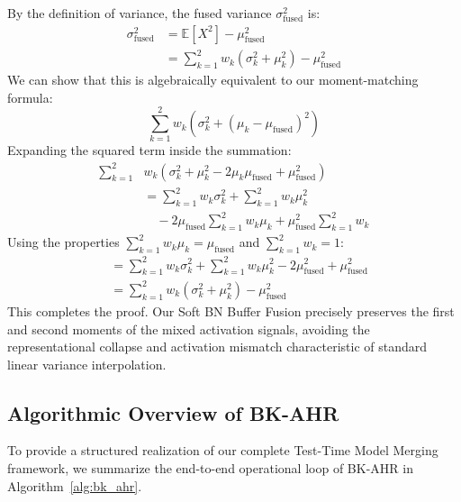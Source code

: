 \documentclass{article}
\theoremstyle{plain}
\theoremstyle{definition}
\theoremstyle{remark}
\begin{document}
By the definition of variance, the fused variance $\sigma_{\mathrm{fused}}^2$ is:
\begin{align}
  \sigma_{\mathrm{fused}}^2 &= \mathbb{E}[X^2] - \mu_{\mathrm{fused}}^2 \nonumber \\
  &= \sum_{k=1}^2 w_k \left( \sigma_k^2 + \mu_k^2 \right) - \mu_{\mathrm{fused}}^2
\end{align}
We can show that this is algebraically equivalent to our moment-matching formula:
\begin{equation}
  \sum_{k=1}^2 w_k \left( \sigma_k^2 + (\mu_k - \mu_{\mathrm{fused}})^2 \right)
\end{equation}
Expanding the squared term inside the summation:
\begin{align}
  \sum_{k=1}^2 & w_k \left( \sigma_k^2 + \mu_k^2 - 2 \mu_k \mu_{\mathrm{fused}} + \mu_{\mathrm{fused}}^2 \right) \nonumber \\
  &= \sum_{k=1}^2 w_k \sigma_k^2 + \sum_{k=1}^2 w_k \mu_k^2 \nonumber \\
  &\quad - 2 \mu_{\mathrm{fused}} \sum_{k=1}^2 w_k \mu_k + \mu_{\mathrm{fused}}^2 \sum_{k=1}^2 w_k
\end{align}
Using the properties $\sum_{k=1}^2 w_k \mu_k = \mu_{\mathrm{fused}}$ and $\sum_{k=1}^2 w_k = 1$:
\begin{align}
  &= \sum_{k=1}^2 w_k \sigma_k^2 + \sum_{k=1}^2 w_k \mu_k^2 - 2 \mu_{\mathrm{fused}}^2 + \mu_{\mathrm{fused}}^2 \nonumber \\
  &= \sum_{k=1}^2 w_k \left( \sigma_k^2 + \mu_k^2 \right) - \mu_{\mathrm{fused}}^2
\end{align}
This completes the proof. Our Soft BN Buffer Fusion precisely preserves the first and second moments of the mixed activation signals, avoiding the representational collapse and activation mismatch characteristic of standard linear variance interpolation.

\subsection{Algorithmic Overview of BK-AHR}
To provide a structured realization of our complete Test-Time Model Merging framework, we summarize the end-to-end operational loop of BK-AHR in Algorithm~\ref{alg:bk_ahr}.
\end{document}
